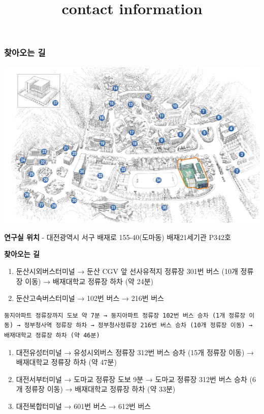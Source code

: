 \documentclass[
]{article}
\title{contact information}
\author{}
\date{\vspace{-2.5em}}
\begin{document}
\maketitle

\hypertarget{uxcc3euxc544uxc624uxb294-uxae38}{%
\subsubsection{찾아오는 길}\label{uxcc3euxc544uxc624uxb294-uxae38}}

\includegraphics{images/figure5.png}

\textbf{연구실 위치} - 대전광역시 서구 배재로 155-40(도마동)
배재21세기관 P342호

\textbf{찾아오는 길}

\begin{enumerate}
\def\labelenumi{\arabic{enumi})}
\item
  둔산시외버스터미널 → 둔산 CGV 앞 선사유적지 정류장 301번 버스 (10개
  정류장 이동) → 배재대학교 정류장 하차 (약 24분)
\item
  둔산고속버스터미널 → 102번 버스 → 216번 버스
\end{enumerate}

\begin{verbatim}
둥지아파트 정류장까지 도보 약 7분 → 둥지아파트 정류장 102번 버스 승차 (1개 정류장 이동) → 정부청사역 정류장 하차 → 정부청사정류장 216번 버스 승차 (10개 정류장 이동) → 배재대학교 정류장 하차 (약 46분)
\end{verbatim}

\begin{enumerate}
\def\labelenumi{\arabic{enumi})}
\setcounter{enumi}{2}
\item
  대전유성터미널 → 유성시외버스 정류장 312번 버스 승차 (15개 정류장
  이동) → 배재대학교 정류장 하차 (약 47분)
\item
  대전서부터미널 → 도마교 정류장 도보 9분 → 도마교 정류장 312번 버스
  승차 (6개 정류장 이동) → 배재대학교 정류장 하차 (약 33분)
\item
  대전복합터미널 → 601번 버스 → 612번 버스
\end{enumerate}
\end{document}
